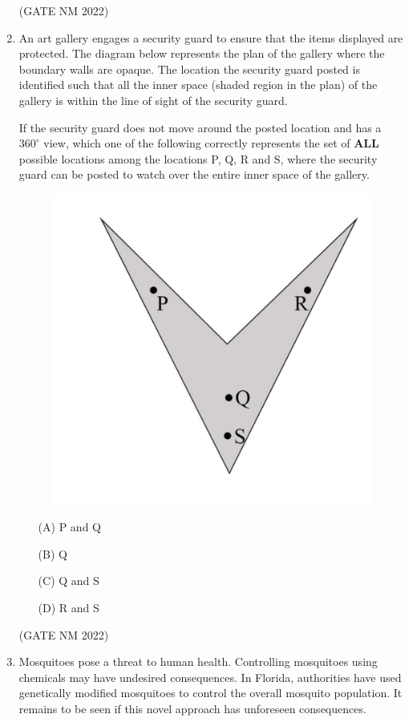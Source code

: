 \documentclass[journal,12pt,onecolumn]{IEEEtran}
\theoremstyle{remark}
\begin{document}
\begin{enumerate}
\hfill(GATE NM 2022)






\item  An art gallery engages a security guard to ensure that the items displayed are protected. The diagram below represents the plan of the gallery where the boundary walls are opaque. The location the security guard posted is identified such that all the inner space (shaded region in the plan) of the gallery is within the line of sight of the security guard.  

If the security guard does not move around the posted location and has a $360^\circ$ view, which one of the following correctly represents the set of \textbf{ALL} possible locations among the locations P, Q, R and S, where the security guard can be posted to watch over the entire inner space of the gallery.  

\begin{figure}[h]
	\centering
	\includegraphics[width=0.5\columnwidth]{fig2}
	\caption{}
	\label{fig:placeholder}
\end{figure}

\begin{enumerate}
    \item[(A)] P and Q
    \item[(B)] Q
    \item[(C)] Q and S
    \item[(D)] R and S
\end{enumerate}

\hfill(GATE NM 2022)





\item  Mosquitoes pose a threat to human health. Controlling mosquitoes using chemicals may have undesired consequences. In Florida, authorities have used genetically modified mosquitoes to control the overall mosquito population. It remains to be seen if this novel approach has unforeseen consequences.  


\end{enumerate}
\end{document}

